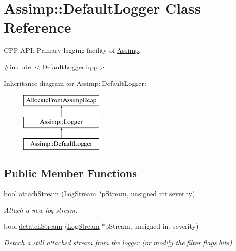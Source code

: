 \hypertarget{class_assimp_1_1_default_logger}{\section{Assimp\-:\-:Default\-Logger Class Reference}
\label{class_assimp_1_1_default_logger}
}


C\-P\-P-\/\-A\-P\-I\-: Primary logging facility of \hyperlink{namespace_assimp}{Assimp}.  




{\ttfamily \#include $<$Default\-Logger.\-hpp$>$}

Inheritance diagram for Assimp\-:\-:Default\-Logger\-:\begin{figure}[H]
\begin{center}
\leavevmode
\includegraphics[height=3.000000cm]{class_assimp_1_1_default_logger}
\end{center}
\end{figure}
\subsection*{Public Member Functions}
\begin{DoxyCompactItemize}
\item 
bool \hyperlink{class_assimp_1_1_default_logger_abc0ca7a337f8c3e38eca0eb45bb1ccf0}{attach\-Stream} (\hyperlink{class_assimp_1_1_log_stream}{Log\-Stream} $\ast$p\-Stream, unsigned int severity)
\begin{DoxyCompactList}\small\item\em Attach a new log-\/stream. \end{DoxyCompactList}\item 
bool \hyperlink{class_assimp_1_1_default_logger_a2615f1d1624f1d742d0cf2dd4a5cccc8}{detatch\-Stream} (\hyperlink{class_assimp_1_1_log_stream}{Log\-Stream} $\ast$p\-Stream, unsigned int severity)
\begin{DoxyCompactList}\small\item\em Detach a still attached stream from the logger (or modify the filter flags bits) \end{DoxyCompactList}\end{DoxyCompactItemize}
